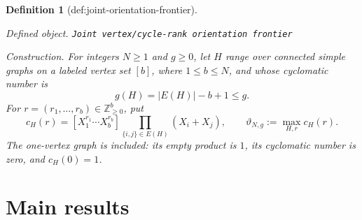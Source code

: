 \documentclass{article}
\newtheorem{definition}{Definition}
\begin{document}
\begin{definition}[def:joint-orientation-frontier]\label{def:joint-orientation-frontier}
\par\smallskip\noindent\emph{Defined object.} \texttt{Joint vertex/\allowbreak{}cycle-\allowbreak{}rank orientation frontier}
\par\smallskip\noindent\emph{Construction.} For integers \(N\geq1\) and \(g\geq0\), let \(H\) range over connected simple graphs on a labeled vertex set \([b]\), where \(1\leq b\leq N\), and whose cyclomatic number is
\[
 g(H)=|E(H)|-b+1\leq g.
\]
For \(r=(r_1,\ldots,r_b)\in\mathbb Z_{\geq0}^{b}\), put
\[
 c_H(r)=[X_1^{r_1}\cdots X_b^{r_b}]
          \prod_{\{i,j\}\in E(H)}(X_i+X_j),
 \qquad
 \vartheta_{N,g}:=\max_{H,r}c_H(r).
\]
The one-vertex graph is included: its empty product is \(1\), its cyclomatic number is zero, and \(c_H(0)=1\).
\end{definition}

\section{Main results}
\end{document}

